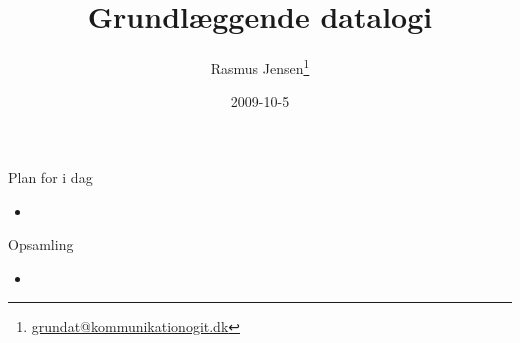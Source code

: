 \documentclass[a4paper,landscape]{slides}
\title{Grundlæggende datalogi}
\author{Rasmus Jensen\footnote{\url{grundat@kommunikationogit.dk}}}
\date{2009-10-5}
\begin{document}
\maketitle

\begin{comment}
 
\end{comment}

\begin{slide}
	\begin{center} {\large 
            Plan for i dag
	} \end{center}
	\begin{itemize} \addtolength{\itemsep}{-\baselineskip}
		\item 
	\end{itemize}
\end{slide}

\begin{slide}
	\begin{center} {\large 
            Opsamling
	} \end{center}
	\begin{itemize} \addtolength{\itemsep}{-\baselineskip}
                \item 
	\end{itemize}
\end{slide}
\end{document}

